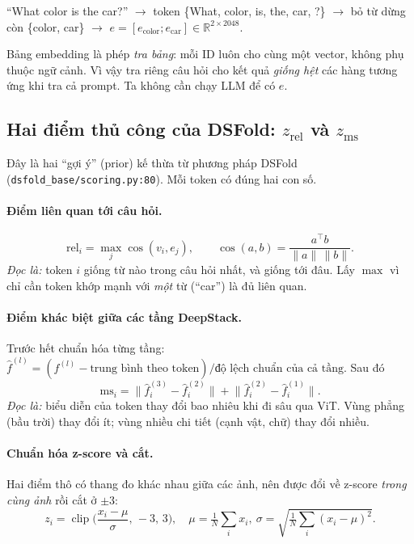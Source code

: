 \documentclass[11pt,a4paper]{article}
\newcommand{\R}{\mathbb{R}}
\newcommand{\file}[1]{\texttt{\small #1}}
\begin{document}
\begin{vidu}
``What color is the car?'' $\to$ token \{What, color, is, the, car, ?\} $\to$ bỏ từ dừng còn \{color, car\} $\to$ $e=[e_\text{color};e_\text{car}]\in\R^{2\times2048}$.
\end{vidu}

\begin{trucgiac}
Bảng embedding là phép \emph{tra bảng}: mỗi ID luôn cho cùng một vector, không phụ thuộc ngữ cảnh. Vì vậy tra riêng câu hỏi cho kết quả \emph{giống hệt} các hàng tương ứng khi tra cả prompt. Ta không cần chạy LLM để có $e$.
\end{trucgiac}

\subsection{Hai điểm thủ công của DSFold: $z_\text{rel}$ và $z_\text{ms}$}
Đây là hai ``gợi ý'' (prior) kế thừa từ phương pháp DSFold (\file{dsfold\_base/scoring.py:80}). Mỗi token có đúng hai con số.

\paragraph{Điểm liên quan tới câu hỏi.}
\begin{equation}
\mathrm{rel}_i=\max_{j}\cos(v_i,e_j),\qquad \cos(a,b)=\frac{a^\top b}{\|a\|\,\|b\|}.
\end{equation}
\emph{Đọc là:} token $i$ giống từ nào trong câu hỏi nhất, và giống tới đâu. Lấy $\max$ vì chỉ cần token khớp mạnh với \emph{một} từ (``car'') là đủ liên quan.

\paragraph{Điểm khác biệt giữa các tầng DeepStack.}
Trước hết chuẩn hóa từng tầng: $\hat f^{(l)}=(f^{(l)}-\text{trung bình theo token})/\text{độ lệch chuẩn của cả tầng}$. Sau đó
\begin{equation}
\mathrm{ms}_i=\big\|\hat f_i^{(3)}-\hat f_i^{(2)}\big\|+\big\|\hat f_i^{(2)}-\hat f_i^{(1)}\big\|.
\end{equation}
\emph{Đọc là:} biểu diễn của token thay đổi bao nhiêu khi đi sâu qua ViT. Vùng phẳng (bầu trời) thay đổi ít; vùng nhiều chi tiết (cạnh vật, chữ) thay đổi nhiều.

\paragraph{Chuẩn hóa z-score và cắt.}
Hai điểm thô có thang đo khác nhau giữa các ảnh, nên được đổi về z-score \emph{trong cùng ảnh} rồi cắt ở $\pm3$:
\begin{equation}
z_i=\operatorname{clip}\!\Big(\frac{x_i-\mu}{\sigma},\,-3,\,3\Big),\quad \mu=\tfrac1N\textstyle\sum_i x_i,\ \sigma=\sqrt{\tfrac1N\sum_i(x_i-\mu)^2}.
\end{equation}
\end{document}
